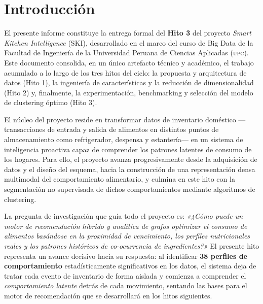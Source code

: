 \documentclass[12pt,a4paper]{article}
\newcommand{\metric}[1]{\textcolor{metricblue}{\textbf{#1}}}
\newcommand{\upc}{\textsc{upc}}
\begin{document}
\tableofcontents
\newpage

\section{Introducción}

El presente informe constituye la entrega formal del \textbf{Hito 3} del proyecto \textit{Smart Kitchen Intelligence} (SKI), desarrollado en el marco del curso de Big Data de la Facultad de Ingeniería de la Universidad Peruana de Ciencias Aplicadas (\upc{}). Este documento consolida, en un único artefacto técnico y académico, el trabajo acumulado a lo largo de los tres hitos del ciclo: la propuesta y arquitectura de datos (Hito 1), la ingeniería de características y la reducción de dimensionalidad (Hito 2) y, finalmente, la experimentación, benchmarking y selección del modelo de clustering óptimo (Hito 3).

El núcleo del proyecto reside en transformar datos de inventario doméstico —transacciones de entrada y salida de alimentos en distintos puntos de almacenamiento como refrigerador, despensa y estantería— en un sistema de inteligencia proactiva capaz de comprender los patrones latentes de consumo de los hogares. Para ello, el proyecto avanza progresivamente desde la adquisición de datos y el diseño del esquema, hacia la construcción de una representación densa multimodal del comportamiento alimentario, y culmina en este hito con la segmentación no supervisada de dichos comportamientos mediante algoritmos de clustering.

La pregunta de investigación que guía todo el proyecto es: \textit{«¿Cómo puede un motor de recomendación híbrido y analítica de grafos optimizar el consumo de alimentos basándose en la proximidad de vencimiento, los perfiles nutricionales reales y los patrones históricos de co-ocurrencia de ingredientes?»} El presente hito representa un avance decisivo hacia su respuesta: al identificar \metric{38 perfiles de comportamiento} estadísticamente significativos en los datos, el sistema deja de tratar cada evento de inventario de forma aislada y comienza a comprender el \textit{comportamiento latente} detrás de cada movimiento, sentando las bases para el motor de recomendación que se desarrollará en los hitos siguientes.
\end{document}
